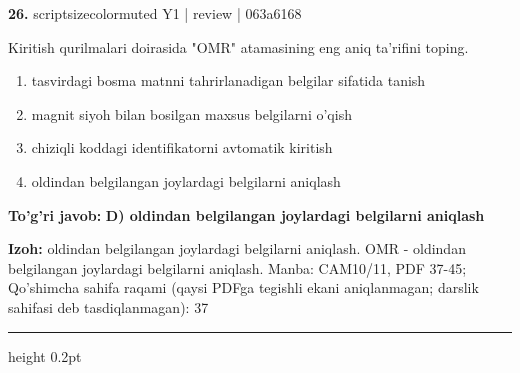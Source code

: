 \documentclass[10pt,a4paper]{article}
\begin{document}
{\bfseries\sffamily\color{ink} 26.} {scriptsizecolor{muted} Y1 | review | 063a6168}
\par
Kiritish qurilmalari doirasida "OMR" atamasining eng aniq ta'rifini toping.
\begin{enumerate}[label=\Alph*),leftmargin=9mm]
\item tasvirdagi bosma matnni tahrirlanadigan belgilar sifatida tanish
\item magnit siyoh bilan bosilgan maxsus belgilarni o'qish
\item chiziqli koddagi identifikatorni avtomatik kiritish
\item oldindan belgilangan joylardagi belgilarni aniqlash
\end{enumerate}
\begin{tcolorbox}[enhanced,breakable,colback=teal!4,colframe=teal!60!black,boxrule=0.45pt,arc=1.2mm,left=2.7mm,right=2.7mm,top=1.8mm,bottom=1.8mm,before skip=2mm,after skip=2mm]
{\bfseries\sffamily\color{teal}To'g'ri javob:} \textbf{D) oldindan belgilangan joylardagi belgilarni aniqlash}
\par\smallskip
{\bfseries Izoh:} oldindan belgilangan joylardagi belgilarni aniqlash. OMR - oldindan belgilangan joylardagi belgilarni aniqlash. Manba: CAM10/11, PDF 37-45; Qo'shimcha sahifa raqami (qaysi PDFga tegishli ekani aniqlanmagan; darslik sahifasi deb tasdiqlanmagan): 37
\end{tcolorbox}
\vspace{2mm}\hrule height 0.2pt\vspace{3mm}
\end{document}
